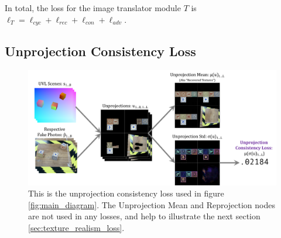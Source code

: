 \documentclass{article}
\begin{document}
In total, the loss for the image translator module $T$ is $\ell_T=\ell_{cyc}+\ell_{rec}+\ell_{con}+\ell_{adv}$.







\subsection{Unprojection Consistency Loss}
\label{sec:unprojection_consistency_loss}

\begin{figure}[H]
	\begin{center}
		\includegraphics[width=400pt]{../images/unprojection_consistency_loss.pdf}
	\end{center}
	\caption{
		This is the unprojection consistency loss used in figure \ref{fig:main_diagram}.
		The Unprojection Mean and Reprojection nodes are not used in any losses, and help to illustrate the next section \ref{sec:texture_realism_loss}.
	}
	\label{fig:unprojection_consistency_loss}
\end{figure}
\end{document}
